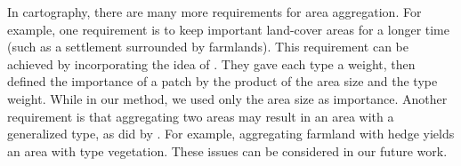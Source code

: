 In cartography, there are many more requirements 
for area aggregation.
For example, one requirement is 
to keep important land-cover areas for a longer time
(such as a settlement surrounded by farmlands).
This requirement can be achieved by incorporating the idea of
\textcite{Dilo2009tGAP}.
They gave each type a weight, 
then defined the importance of a patch 
by the product of the area size and the type weight.
While in our method, we used only the area size as importance.
%
Another requirement is that 
aggregating two areas may result in 
an area with a generalized type,
as did by \textcite{vanSmaalen2003}. 
For example, aggregating 
farmland with hedge yields an area with type vegetation.
%
These issues can be considered in our future work.
%






